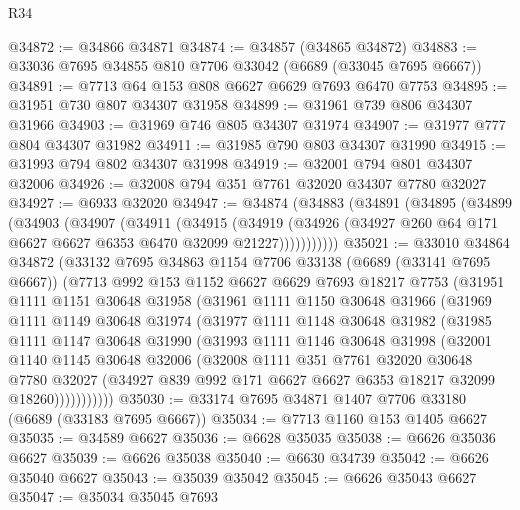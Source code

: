 \begin{lexlean}{R34}
\begin{coremodule}
@34872 := @34866 @34871
@34874 := @34857 (@34865 @34872)
@34883 := @33036 @7695 @34855 @810 @7706 @33042 (@6689 (@33045 @7695 @6667))
@34891 := @7713 @64 @153 @808 @6627 @6629 @7693 @6470 @7753
@34895 := @31951 @730 @807 @34307 @31958
@34899 := @31961 @739 @806 @34307 @31966
@34903 := @31969 @746 @805 @34307 @31974
@34907 := @31977 @777 @804 @34307 @31982
@34911 := @31985 @790 @803 @34307 @31990
@34915 := @31993 @794 @802 @34307 @31998
@34919 := @32001 @794 @801 @34307 @32006
@34926 := @32008 @794 @351 @7761 @32020 @34307 @7780 @32027
@34927 := @6933 @32020
@34947 := @34874
    (@34883
      (@34891
        (@34895
          (@34899
            (@34903
              (@34907
                (@34911
                  (@34915
                    (@34919
                      (@34926 (@34927 @260 @64 @171 @6627 @6627 @6353 @6470 @32099 @21227)))))))))))
@35021 := @33010
    @34864
    @34872
    (@33132
      @7695
      @34863
      @1154
      @7706
      @33138
      (@6689 (@33141 @7695 @6667))
      (@7713
        @992
        @153
        @1152
        @6627
        @6629
        @7693
        @18217
        @7753
        (@31951
          @1111
          @1151
          @30648
          @31958
          (@31961
            @1111
            @1150
            @30648
            @31966
            (@31969
              @1111
              @1149
              @30648
              @31974
              (@31977
                @1111
                @1148
                @30648
                @31982
                (@31985
                  @1111
                  @1147
                  @30648
                  @31990
                  (@31993
                    @1111
                    @1146
                    @30648
                    @31998
                    (@32001
                      @1140
                      @1145
                      @30648
                      @32006
                      (@32008
                        @1111
                        @351
                        @7761
                        @32020
                        @30648
                        @7780
                        @32027
                        (@34927 @839 @992 @171 @6627 @6627 @6353 @18217 @32099 @18260)))))))))))
@35030 := @33174 @7695 @34871 @1407 @7706 @33180 (@6689 (@33183 @7695 @6667))
@35034 := @7713 @1160 @153 @1405 @6627
@35035 := @34589 @6627
@35036 := @6628 @35035
@35038 := @6626 @35036 @6627
@35039 := @6626 @35038
@35040 := @6630 @34739
@35042 := @6626 @35040 @6627
@35043 := @35039 @35042
@35045 := @6626 @35043 @6627
@35047 := @35034 @35045 @7693

\end{coremodule}
\end{lexlean}
